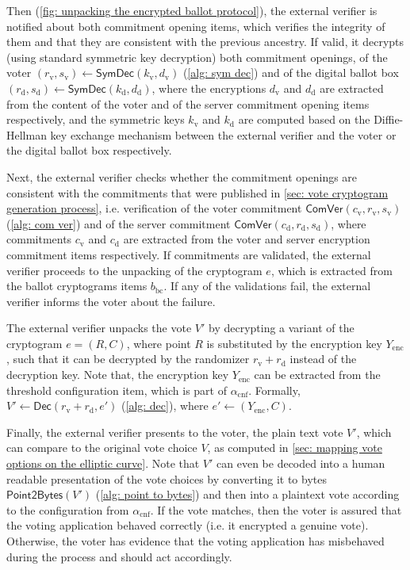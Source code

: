 Then (\cref{fig: unpacking the encrypted ballot protocol}), the external verifier is notified about both commitment opening items, which verifies the integrity of them and that they are consistent with the previous ancestry. If valid, it decrypts (using standard symmetric key decryption) both commitment openings, of the voter $(r_\mathrm{v}, s_\mathrm{v}) \gets \mathsf{SymDec}(k_\mathrm{v}, d_\mathrm{v})$ (\cref{alg: sym dec}) and of the digital ballot box $(r_\mathrm{d}, s_\mathrm{d}) \gets \mathsf{SymDec}(k_\mathrm{d}, d_\mathrm{d})$, where the encryptions $d_\mathrm{v}$ and $d_\mathrm{d}$ are extracted from the content of the voter and of the server commitment opening items respectively, and the symmetric keys $k_\mathrm{v}$ and $k_\mathrm{d}$ are computed based on the Diffie-Hellman key exchange mechanism between the external verifier and the voter or the digital ballot box respectively.

Next, the external verifier checks whether the commitment openings are consistent with the commitments that were published in \cref{sec: vote cryptogram generation process}, i.e. verification of the voter commitment $\mathsf{ComVer}(c_\mathrm{v}, r_\mathrm{v}, s_\mathrm{v})$ (\cref{alg: com ver}) and of the server commitment $\mathsf{ComVer}(c_\mathrm{d}, r_\mathrm{d}, s_\mathrm{d})$, where commitments $c_\mathrm{v}$ and $c_\mathrm{d}$ are extracted from the voter and server encryption commitment items respectively. If commitments are validated, the external verifier proceeds to the unpacking of the cryptogram $e$, which is extracted from the ballot cryptograms items $b_\mathrm{bc}$. If any of the validations fail, the external verifier informs the voter about the failure.

The external verifier unpacks the vote $V'$ by decrypting a variant of the cryptogram $e = (R, C)$, where point $R$ is substituted by the encryption key $Y_\mathrm{enc}$, such that it can be decrypted by the randomizer $r_\mathrm{v} + r_\mathrm{d}$ instead of the decryption key. Note that, the encryption key $Y_\mathrm{enc}$ can be extracted from the threshold configuration item, which is part of $\alpha_\mathrm{cnf}$. Formally, $V' \gets \mathsf{Dec}(r_\mathrm{v} + r_\mathrm{d}, e')$ (\cref{alg: dec}), where $e' \gets (Y_\mathrm{enc}, C)$.

Finally, the external verifier presents to the voter, the plain text vote $V'$, which can compare to the original vote choice $V$, as computed in \cref{sec: mapping vote options on the elliptic curve}. Note that $V'$ can even be decoded into a human readable presentation of the vote choices by converting it to bytes $\mathsf{Point2Bytes}(V')$ (\cref{alg: point to bytes}) and then into a plaintext vote according to the configuration from $\alpha_\mathrm{cnf}$. If the vote matches, then the voter is assured that the voting application behaved correctly (i.e. it encrypted a genuine vote). Otherwise, the voter has evidence that the voting application has misbehaved during the process and should act accordingly.

